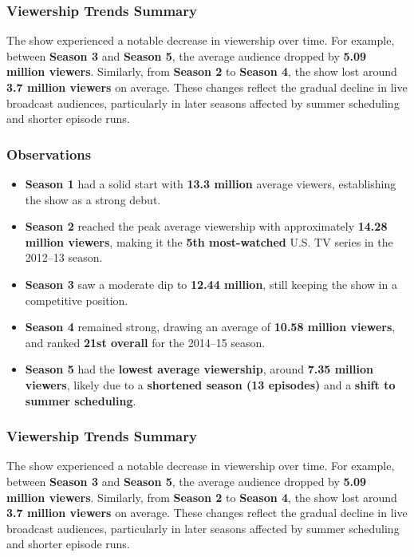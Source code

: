 \documentclass[
  letterpaper,
  DIV=11,
  numbers=noendperiod]{scrartcl}
\providecommand{\tightlist}{%
  \setlength{\itemsep}{0pt}\setlength{\parskip}{0pt}}\usepackage{longtable,booktabs,array}
\begin{document}
\subsubsection{Viewership Trends Summary}

The show experienced a notable decrease in viewership over time. For
example, between \textbf{Season 3} and \textbf{Season 5}, the average
audience dropped by \textbf{5.09 million viewers}. Similarly, from
\textbf{Season 2} to \textbf{Season 4}, the show lost around \textbf{3.7
million viewers} on average. These changes reflect the gradual decline
in live broadcast audiences, particularly in later seasons affected by
summer scheduling and shorter episode runs.

\hypertarget{observations-1}{%
\subsubsection{Observations}\label{observations-1}}

\begin{itemize}
\tightlist
\item
  \textbf{Season 1} had a solid start with \textbf{13.3 million} average
  viewers, establishing the show as a strong debut.
\item
  \textbf{Season 2} reached the peak average viewership with
  approximately \textbf{14.28 million viewers}, making it the
  \textbf{5th most-watched} U.S. TV series in the 2012--13 season.
\item
  \textbf{Season 3} saw a moderate dip to \textbf{12.44 million}, still
  keeping the show in a competitive position.
\item
  \textbf{Season 4} remained strong, drawing an average of \textbf{10.58
  million viewers}, and ranked \textbf{21st overall} for the 2014--15
  season.
\item
  \textbf{Season 5} had the \textbf{lowest average viewership}, around
  \textbf{7.35 million viewers}, likely due to a \textbf{shortened
  season (13 episodes)} and a \textbf{shift to summer scheduling}.
\end{itemize}

\hypertarget{viewership-trends-summary-1}{%
\subsubsection{Viewership Trends
Summary}\label{viewership-trends-summary-1}}

The show experienced a notable decrease in viewership over time. For
example, between \textbf{Season 3} and \textbf{Season 5}, the average
audience dropped by \textbf{5.09 million viewers}. Similarly, from
\textbf{Season 2} to \textbf{Season 4}, the show lost around \textbf{3.7
million viewers} on average. These changes reflect the gradual decline
in live broadcast audiences, particularly in later seasons affected by
summer scheduling and shorter episode runs.
\end{document}
